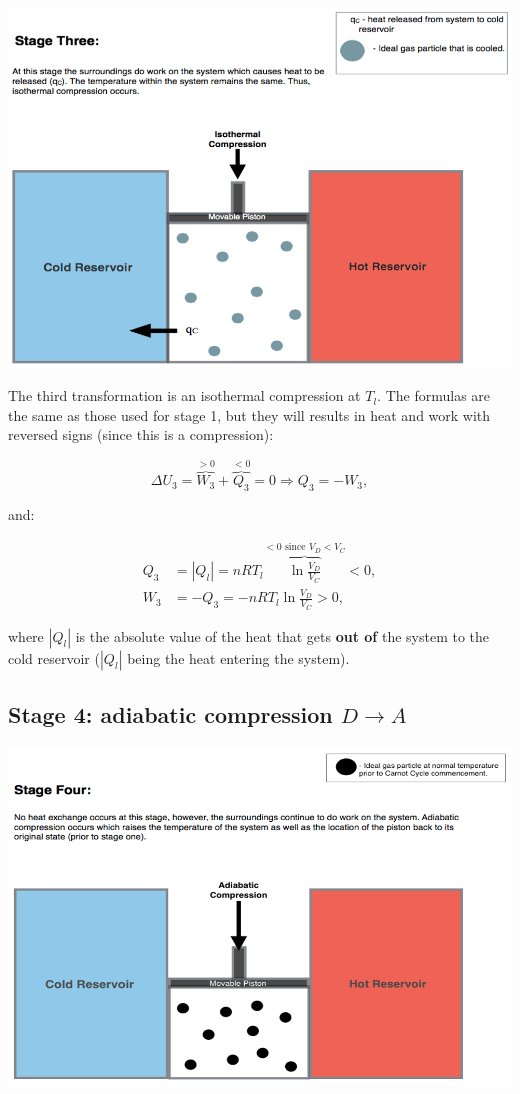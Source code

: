 \documentclass[
  9pt,
]{extbook}
\theoremstyle{definition}
\theoremstyle{definition}
\theoremstyle{definition}
\theoremstyle{remark}
\begin{document}
\begin{center}\includegraphics[width=0.7\linewidth]{./img/OEP_Figures.007c} \end{center}

The third transformation is an isothermal compression at \(T_l\). The formulas are the same as those used for stage 1, but they will results in heat and work with reversed signs (since this is a compression):

\begin{equation}
\Delta U_3 = \overbrace{W_3}^{>0} + \overbrace{Q_3}^{<0} = 0 \Rightarrow Q_3 = -W_3,
  \label{eq:CCst3}
\end{equation}

and:

\begin{equation}
\begin{aligned}
 Q_3 & = \left| Q_l \right|  = nRT_l \overbrace{\ln \frac{V_D}{V_C}}^{<0 \text{ since } V_D<V_C} < 0 , \\
 W_3 & = -Q_3 = - nRT_l \ln \frac{V_D}{V_C} > 0,
\end{aligned}
  \label{eq:CCst3b}
\end{equation}

where \(\left| Q_l \right|\) is the absolute value of the heat that gets \textbf{out of} the system to the cold reservoir (\(\left| Q_l \right|\) being the heat entering the system).

\hypertarget{CCstage4}{%
\subsection{\texorpdfstring{Stage 4: adiabatic compression \(D \rightarrow A\)}{Stage 4: adiabatic compression D \textbackslash rightarrow A}}\label{CCstage4}}

\begin{center}\includegraphics[width=0.7\linewidth]{./img/OEP_Figures.007d} \end{center}
\end{document}
